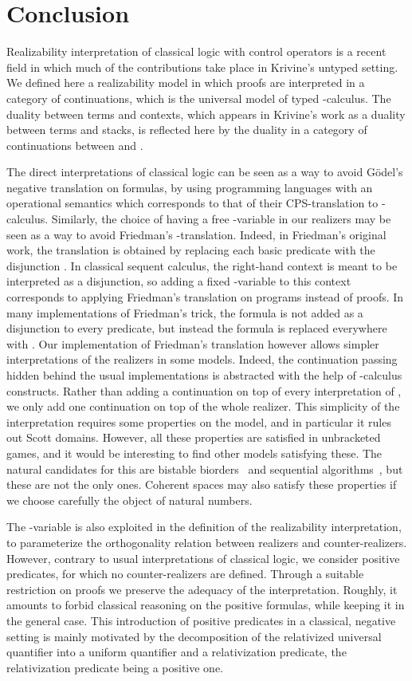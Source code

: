 \documentclass{CSML}
\begin{document}
\section*{Conclusion}
Realizability interpretation of classical logic with control operators is a recent field in which much of the contributions take place in Krivine's untyped setting. We defined here a realizability model in which proofs are interpreted in a category of continuations, which is the universal model of typed -calculus. The duality between terms and contexts, which appears in Krivine's work as a duality between terms and stacks, is reflected here by the duality in a category of continuations  between  and .\par
The direct interpretations of classical logic can be seen as a way to avoid G\"odel's negative translation on formulas, by using programming languages with an operational semantics which corresponds to that of their CPS-translation to -calculus. Similarly, the choice of having a free -variable  in our realizers may be seen as a way to avoid Friedman's -translation. Indeed, in Friedman's original work, the translation is obtained by replacing each basic predicate  with the disjunction . In classical sequent calculus, the right-hand context is meant to be interpreted as a disjunction, so adding a fixed -variable to this context corresponds to applying Friedman's translation on programs instead of proofs. In many implementations of Friedman's trick, the formula  is not added as a disjunction to every predicate, but instead the  formula is replaced everywhere with . Our implementation of Friedman's translation however allows simpler interpretations of the realizers in some models. Indeed, the continuation passing hidden behind the usual implementations is abstracted with the help of -calculus constructs. Rather than adding a continuation on top of every interpretation of , we only add one continuation on top of the whole realizer. This simplicity of the interpretation requires some properties on the model, and in particular it rules out Scott domains. However, all these properties are satisfied in unbracketed games, and it would be interesting to find other models satisfying these. The natural candidates for this are bistable biorders~\cite{LairdBistable} and sequential algorithms~\cite{BerryCurienSequential}, but these are not the only ones. Coherent spaces may also satisfy these properties if we choose carefully the object of natural numbers.\par
The -variable  is also exploited in the definition of the realizability interpretation, to parameterize the orthogonality relation between realizers and counter-realizers. However, contrary to usual interpretations of classical logic, we consider positive predicates, for which no counter-realizers are defined. Through a suitable restriction on proofs we preserve the adequacy of the interpretation. Roughly, it amounts to forbid classical reasoning on the positive formulas, while keeping it in the general case. This introduction of positive predicates in a classical, negative setting is mainly motivated by the decomposition of the relativized universal quantifier into a uniform quantifier and a relativization predicate, the relativization predicate being a positive one.\par
\end{document}
